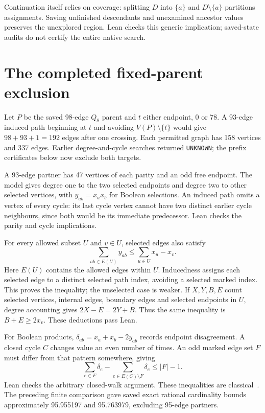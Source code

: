 \documentclass[11pt,a4paper]{article}
\begin{document}
Continuation itself relies on coverage: splitting $D$ into $\{a\}$ and
$D\setminus\{a\}$ partitions assignments. Saving unfinished descendants and
unexamined ancestor values preserves the unexplored region. Lean checks this
generic implication; saved-state audits do not certify the entire native search.

\section{The completed fixed-parent exclusion}
Let $P$ be the saved 98-edge $Q_8$ parent and $t$ either endpoint, 0 or 78.
A 93-edge induced path beginning at $t$ and avoiding $V(P)\setminus\{t\}$
would give $98+93+1=192$ edges after one crossing. Each permitted graph
has 158 vertices and 337 edges. Earlier degree-and-cycle searches returned
\texttt{UNKNOWN}; the prefix certificates below now exclude both targets.

A 93-edge partner has 47 vertices of each parity and an odd free endpoint.
The model gives degree one to the two selected endpoints and degree two
to other selected vertices, with $y_{ab}=x_ax_b$ for Boolean selections.
An induced path omits a vertex of every cycle: its last cycle vertex
cannot have two distinct earlier cycle neighbours, since both would be
its immediate predecessor. Lean checks the parity and cycle implications.

For every allowed subset $U$ and $v\in U$, selected edges also satisfy
\[
\sum_{ab\in E(U)}y_{ab}\le\sum_{u\in U}x_u-x_v.
\]
Here $E(U)$ contains the allowed edges within $U$. Inducedness assigns
each selected edge to a distinct selected path index, avoiding a selected
marked index. This proves the inequality; the unselected case is weaker.
If $X,Y,B,E$ count selected vertices, internal edges, boundary edges and
selected endpoints in $U$, degree accounting gives $2X-E=2Y+B$.
Thus the same inequality is $B+E\ge2x_v$. These deductions pass Lean.

For Boolean products, $\delta_{ab}=x_a+x_b-2y_{ab}$ records endpoint
disagreement. A closed cycle $C$ changes value an even number of times.
An odd marked edge set $F$ must differ from that pattern somewhere, giving
\[
\sum_{e\in F}\delta_e-\sum_{e\in E(C)\setminus F}\delta_e\le|F|-1.
\]
Lean checks the arbitrary closed-walk argument. These inequalities are
classical~\cite{barahona1986}. The preceding finite comparison gave saved exact rational
cardinality bounds approximately 95.955197 and 95.763979, excluding
95-edge partners.
\end{document}
